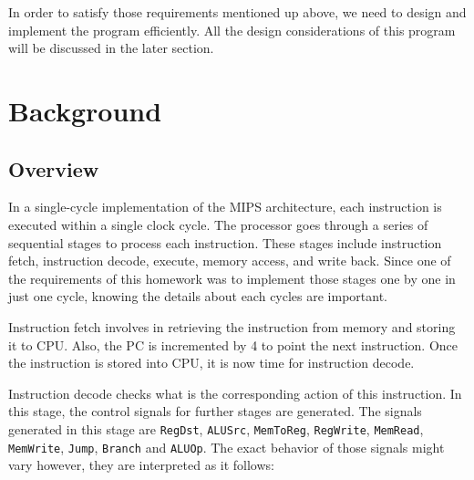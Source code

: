 \documentclass{homework}
\begin{document}
In order to satisfy those requirements mentioned up above, we need to design and implement the program efficiently. All the design considerations of this program will be discussed in the later section.

\section{Background}
\subsection{Overview}
In a single-cycle implementation of the MIPS architecture, each instruction is executed within a single clock cycle. The processor goes through a series of sequential stages to process each instruction. These stages include instruction fetch, instruction decode, execute, memory access, and write back. Since one of the requirements of this homework was to implement those stages one by one in just one cycle, knowing the details about each cycles are important. 

Instruction fetch involves in retrieving the instruction from memory and storing it to CPU. Also, the PC is incremented by 4 to point the next instruction. Once the instruction is stored into CPU, it is now time for instruction decode.

Instruction decode checks what is the corresponding action of this instruction. In this stage, the control signals for further stages are generated. The signals generated in this stage are \texttt{RegDst}, \texttt{ALUSrc}, \texttt{MemToReg}, \texttt{RegWrite}, \texttt{MemRead}, \texttt{MemWrite}, \texttt{Jump}, \texttt{Branch} and \texttt{ALUOp}. The exact behavior of those signals might vary however, they are interpreted as it follows:
\end{document}
